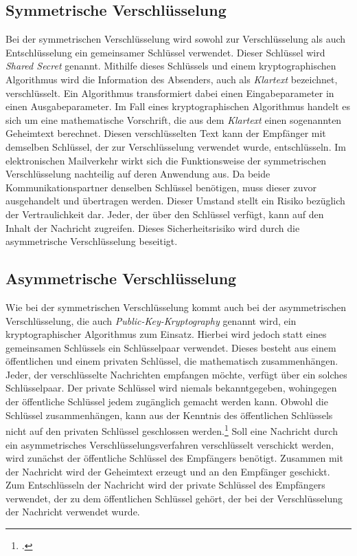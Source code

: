 \documentclass  [paper=a4,
				fontsize=12pt,
				listof=totoc,
				bibliography=totoc
				]{scrreprt}
\begin{document}
			\subsection{Symmetrische Verschlüsselung}
				Bei der symmetrischen Verschlüsselung wird sowohl zur Verschlüsselung als auch Entschlüsselung ein gemeinsamer Schlüssel verwendet. Dieser Schlüssel wird \textit{Shared Secret} genannt. Mithilfe dieses Schlüssels und einem kryptographischen Algorithmus wird die Information des Absenders, auch als \textit{Klartext} bezeichnet, verschlüsselt. Ein Algorithmus transformiert dabei einen Eingabeparameter in einen Ausgabeparameter. Im Fall eines kryptographischen Algorithmus handelt es sich um eine mathematische Vorschrift, die aus dem \textit{Klartext} einen sogenannten Geheimtext berechnet. Diesen verschlüsselten Text kann der Empfänger mit demselben Schlüssel, der zur Verschlüsselung verwendet wurde, entschlüsseln.
				Im elektronischen Mailverkehr wirkt sich die Funktionsweise der symmetrischen Verschlüsselung nachteilig auf deren Anwendung aus. Da beide Kommunikationspartner denselben Schlüssel benötigen, muss dieser zuvor ausgehandelt und übertragen werden. Dieser Umstand stellt ein Risiko bezüglich der Vertraulichkeit dar. Jeder, der über den Schlüssel verfügt, kann auf den Inhalt der Nachricht zugreifen. Dieses Sicherheitsrisiko wird durch die asymmetrische Verschlüsselung beseitigt.
			\subsection{Asymmetrische Verschlüsselung}
				Wie bei der symmetrischen Verschlüsselung kommt auch bei der asymmetrischen Verschlüsselung, die auch \textit{Public-Key-Kryptography} genannt wird, ein kryptographischer Algorithmus zum Einsatz. Hierbei wird jedoch statt eines gemeinsamen Schlüssels ein Schlüsselpaar verwendet. Dieses besteht aus einem öffentlichen und einem privaten Schlüssel, die mathematisch zusammenhängen. Jeder, der verschlüsselte Nachrichten empfangen möchte, verfügt über ein solches Schlüsselpaar. Der private Schlüssel wird niemals bekanntgegeben, wohingegen der öffentliche Schlüssel jedem zugänglich gemacht werden kann. Obwohl die Schlüssel zusammenhängen, kann aus der Kenntnis des öffentlichen Schlüssels nicht auf den privaten Schlüssel geschlossen werden.\footcite[Vgl.][S. 177]{Schmeh2013}
				Soll eine Nachricht durch ein asymmetrisches Verschlüsselungsverfahren verschlüsselt verschickt werden, wird zunächst der öffentliche Schlüssel des Empfängers benötigt. Zusammen mit der Nachricht wird der Geheimtext erzeugt und an den Empfänger geschickt. Zum Entschlüsseln der Nachricht wird der private Schlüssel des Empfängers verwendet, der zu dem öffentlichen Schlüssel gehört, der bei der Verschlüsselung der Nachricht verwendet wurde.
				
\end{document}
